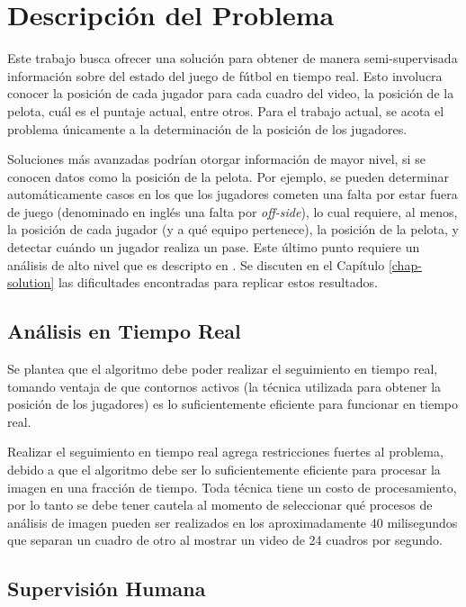 \chapter{Descripción del Problema}
\label{chap-problems}

Este trabajo busca ofrecer una solución para obtener de manera semi-supervisada
información sobre del estado del juego de fútbol en tiempo real. Esto involucra
conocer la posición de cada jugador para cada cuadro del video, la posición de
la pelota, cuál es el puntaje actual, entre otros. Para el trabajo actual, se
acota el problema únicamente a la determinación de la posición de los
jugadores.

Soluciones más avanzadas podrían otorgar información de mayor nivel,
si se conocen datos como la posición de la pelota. Por ejemplo, se pueden
determinar automáticamente casos en los que los jugadores cometen una falta por
estar fuera de juego (denominado en inglés una falta por \textit{off-side}), lo
cual requiere, al menos, la posición de cada jugador (y a qué equipo
pertenece), la posición de la pelota, y detectar cuándo un jugador realiza un
pase. Este último punto requiere un análisis de alto nivel que es descripto en
\cite{papers-tanos}. Se discuten en el Capítulo \ref{chap-solution} las
dificultades encontradas para replicar estos resultados.

\section{Análisis en Tiempo Real}

Se plantea que el algoritmo debe poder realizar el seguimiento en tiempo
real, tomando ventaja de que contornos activos (la técnica utilizada para
obtener la posición de los jugadores) es lo suficientemente eficiente para
funcionar en tiempo real.

Realizar el seguimiento en tiempo real agrega restricciones fuertes al
problema, debido a que el algoritmo debe ser lo suficientemente eficiente para
procesar la imagen en una fracción de tiempo. Toda técnica tiene un costo de
procesamiento, por lo tanto se debe tener cautela al momento de seleccionar qué
procesos de análisis de imagen pueden ser realizados en los aproximadamente 40
milisegundos que separan un cuadro de otro al mostrar un video de 24 cuadros
por segundo.

\section{Supervisión Humana}

